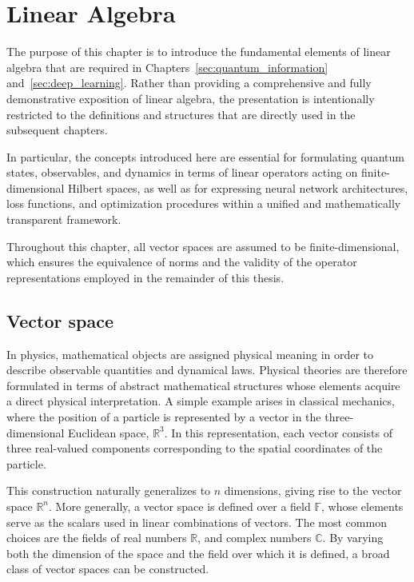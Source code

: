 \chapter{Linear Algebra}
\label{sec:linear_algebra}

The purpose of this chapter is to introduce the fundamental elements of linear algebra that are required in Chapters~\ref{sec:quantum_information} and~\ref{sec:deep_learning}. Rather than providing a comprehensive and fully demonstrative exposition of linear algebra, the presentation is intentionally restricted to the definitions and structures that are directly used in the subsequent chapters.

In particular, the concepts introduced here are essential for formulating quantum states, observables, and dynamics in terms of linear operators acting on finite-dimensional Hilbert spaces, as well as for expressing neural network architectures, loss functions, and optimization procedures within a unified and mathematically transparent framework.

Throughout this chapter, all vector spaces are assumed to be finite-dimensional, which ensures the equivalence of norms and the validity of the operator representations employed in the remainder of this thesis.

\section{Vector space}
\label{sec:vectorial-space}

In physics, mathematical objects are assigned physical meaning in order to describe observable quantities and dynamical laws. Physical theories are therefore formulated in terms of abstract mathematical structures whose elements acquire a direct physical interpretation. A simple example arises in classical mechanics, where the position of a particle is represented by a vector in the three-dimensional Euclidean space, $\mathbb{R}^3$. In this representation, each vector consists of three real-valued components corresponding to the spatial coordinates of the particle.

This construction naturally generalizes to $n$ dimensions, giving rise to the vector space $\mathbb{R}^n$. More generally, a vector space is defined over a field $\mathbb{F}$, whose elements serve as the scalars used in linear combinations of vectors. The most common choices are the fields of real numbers $\mathbb{R}$, and complex numbers $\mathbb{C}$. By varying both the dimension of the space and the field over which it is defined, a broad class of vector spaces can be constructed.

